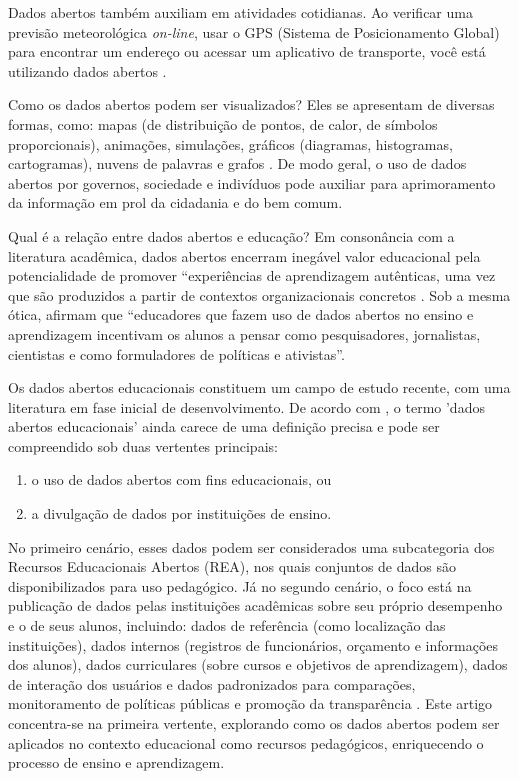 \documentclass[portuguese]{textolivre}
\begin{document}
Dados abertos também auxiliam em atividades cotidianas. Ao verificar uma previsão meteorológica \textit{on-line}, usar o GPS (Sistema de Posicionamento Global) para encontrar um endereço ou acessar um aplicativo de transporte, você está utilizando dados abertos \cite{world_bank_data_catalog2018}. 

Como os dados abertos podem ser visualizados? Eles se apresentam de diversas formas, como: mapas (de distribuição de pontos, de calor, de símbolos proporcionais), animações, simulações, gráficos (diagramas, histogramas, cartogramas), nuvens de palavras e grafos \cite{zoss2016,buzato2018}. De modo geral, o uso de dados abertos por governos, sociedade e indivíduos pode auxiliar para aprimoramento da informação em prol da cidadania e do bem comum.

Qual é a relação entre dados abertos e educação? Em consonância com a literatura acadêmica, dados abertos encerram inegável valor educacional pela potencialidade de promover “experiências de aprendizagem autênticas, uma vez que são produzidos a partir de contextos organizacionais concretos \cite[p.~387, tradução nossa]{coughlan2019}. Sob a mesma ótica, \textcite[p.~23, tradução nossa]{atenas2015} afirmam que “educadores que fazem uso de dados abertos no ensino e aprendizagem incentivam os alunos a pensar como pesquisadores, jornalistas, cientistas e como formuladores de políticas e ativistas”. 

Os dados abertos educacionais constituem um campo de estudo recente, com uma literatura em fase inicial de desenvolvimento. De acordo com \textcite{guy2016}, o termo 'dados abertos educacionais' ainda carece de uma definição precisa e pode ser compreendido sob duas vertentes principais: 

\begin{enumerate}
    \item o uso de dados abertos com fins educacionais, ou
    \item a divulgação de dados por instituições de ensino.
\end{enumerate}
 
No primeiro cenário, esses dados podem ser considerados uma subcategoria dos Recursos Educacionais Abertos (REA), nos quais conjuntos de dados são disponibilizados para uso pedagógico. Já no segundo cenário, o foco está na publicação de dados pelas instituições acadêmicas sobre seu próprio desempenho e o de seus alunos, incluindo: dados de referência (como localização das instituições), dados internos (registros de funcionários, orçamento e informações dos alunos), dados curriculares (sobre cursos e objetivos de aprendizagem), dados de interação dos usuários e dados padronizados para comparações, monitoramento de políticas públicas e promoção da transparência \cite{penteado2017,penteado2019,alcantara2020}.  Este artigo concentra-se na primeira vertente, explorando como os dados abertos podem ser aplicados no contexto educacional como recursos pedagógicos, enriquecendo o processo de ensino e aprendizagem.
\end{document}
